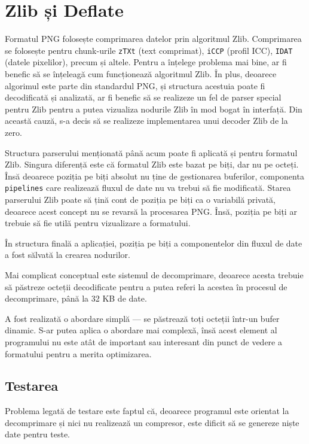 \documentclass[a4paper,12pt]{report}
\begin{document}
\section{Zlib și Deflate}

Formatul \ac{PNG} folosește comprimarea datelor prin algoritmul Zlib.
Comprimarea se folosește pentru chunk-urile \texttt{zTXt} (text comprimat),
\texttt{iCCP} (profil \ac{ICC}), \texttt{IDAT} (datele pixelilor), precum și altele.
Pentru a înțelege problema mai bine, ar fi benefic să se înțeleagă cum funcționează algoritmul Zlib.
În plus, deoarece algorimul este parte din standardul \ac{PNG},
și structura acestuia poate fi decodificată și analizată,
ar fi benefic să se realizeze un fel de parser special pentru Zlib pentru a putea vizualiza nodurile Zlib
în mod bogat în interfață.
Din această cauză, s-a decis să se realizeze implementarea unui decoder Zlib de la zero.

Structura parserului menționată până acum poate fi aplicată și pentru formatul Zlib.
Singura diferență este că formatul Zlib este bazat pe biți, dar nu pe octeți.
Însă deoarece poziția pe biți absolut nu ține de gestionarea buferilor,
componenta \texttt{pipelines} care realizează fluxul de date nu va trebui să fie modificată.
Starea parserului Zlib poate să țină cont de poziția pe biți ca o variabilă privată, deoarece
acest concept nu se revarsă la procesarea \ac{PNG}.
Însă, poziția pe biți ar trebuie să fie utilă pentru vizualizare a formatului.

În structura finală a aplicației, poziția pe biți a componentelor din fluxul de date a fost sălvată la crearea nodurilor.

Mai complicat conceptual este sistemul de decomprimare,
deoarece acesta trebuie să păstreze octeții decodificate pentru a putea referi la acestea
în procesul de decomprimare, până la 32 KB de date.

A fost realizată o abordare simplă --- se păstrează toți octeții într-un bufer dinamic.
S-ar putea aplica o abordare mai complexă, însă acest element al programului
nu este atât de important sau interesant din punct de vedere a formatului pentru a merita optimizarea.

\subsection{Testarea}

Problema legată de testare este faptul că, deoarece programul este orientat
la decomprimare și nici nu realizează un compresor,
este dificit să se genereze niște date pentru teste.
\end{document}
